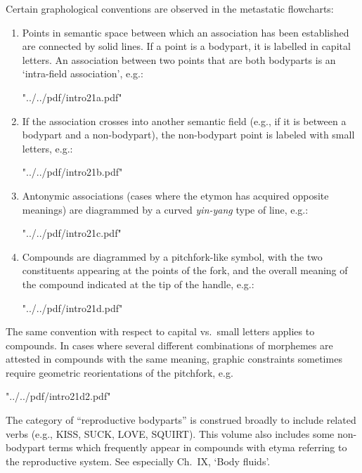 Certain graphological conventions are observed in the metastatic flowcharts:

\begin{enumerate}
\item Points in semantic space between which an association has been established
are connected by solid lines. If a point is a bodypart, it is labelled in
capital letters. An association between two points that are both bodyparts is
an ‘intra-field association’, e.g.:

\XeTeXpdffile "../../pdf/intro21a.pdf"

\item If the association crosses into another semantic field (e.g., if it is between a bodypart and a non-bodypart), the
non-bodypart point is labeled with small letters, e.g.:

\XeTeXpdffile "../../pdf/intro21b.pdf" 

\item Antonymic associations (cases where the etymon has acquired opposite
meanings) are diagrammed by a curved \textit{yin-yang} type of line, e.g.:

\XeTeXpdffile "../../pdf/intro21c.pdf"

\item Compounds are diagrammed by a pitchfork-like symbol, with the two
constituents appearing at the points of the fork, and the overall meaning of the
compound indicated at the tip of the handle, e.g.:

\XeTeXpdffile "../../pdf/intro21d.pdf" 

\end{enumerate}

The same convention with respect to capital vs.\ small letters applies to
compounds. In cases where several different combinations of morphemes are attested in compounds with the same meaning, graphic constraints sometimes require geometric reorientations of the pitchfork, e.g.

\XeTeXpdffile "../../pdf/intro21d2.pdf"

The category of “reproductive bodyparts” is construed broadly to include
related verbs (e.g., KISS, SUCK, LOVE, SQUIRT). This volume also includes some
non-bodypart terms which frequently appear in compounds with etyma referring to
the reproductive system. See especially Ch.~IX, ‘Body fluids’.



